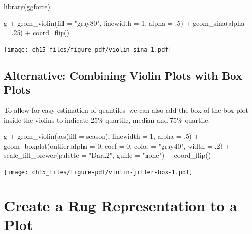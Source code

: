 \documentclass[
  letterpaper,
]{scrbook}
\newenvironment{Shaded}{\begin{snugshade}}{\end{snugshade}}
\newcommand{\AttributeTok}[1]{\textcolor[rgb]{0.40,0.45,0.13}{#1}}
\newcommand{\DecValTok}[1]{\textcolor[rgb]{0.68,0.00,0.00}{#1}}
\newcommand{\FunctionTok}[1]{\textcolor[rgb]{0.28,0.35,0.67}{#1}}
\newcommand{\NormalTok}[1]{\textcolor[rgb]{0.00,0.23,0.31}{#1}}
\newcommand{\SpecialCharTok}[1]{\textcolor[rgb]{0.37,0.37,0.37}{#1}}
\newcommand{\StringTok}[1]{\textcolor[rgb]{0.13,0.47,0.30}{#1}}
\begin{document}
\begin{Shaded}
\begin{Highlighting}[]
\FunctionTok{library}\NormalTok{(ggforce)}

\NormalTok{g }\SpecialCharTok{+} \FunctionTok{geom\_violin}\NormalTok{(}\AttributeTok{fill =} \StringTok{"gray80"}\NormalTok{, }\AttributeTok{linewidth =} \DecValTok{1}\NormalTok{, }\AttributeTok{alpha =}\NormalTok{ .}\DecValTok{5}\NormalTok{) }\SpecialCharTok{+}
    \FunctionTok{geom\_sina}\NormalTok{(}\AttributeTok{alpha =}\NormalTok{ .}\DecValTok{25}\NormalTok{) }\SpecialCharTok{+}
    \FunctionTok{coord\_flip}\NormalTok{()}
\end{Highlighting}
\end{Shaded}

\texttt{[image: ch15\_files/figure-pdf/violin-sina-1.pdf]}

\subsection{Alternative: Combining Violin Plots with Box
Plots}\label{alternative-combining-violin-plots-with-box-plots}

To allow for easy estimation of quantiles, we can also add the box of
the box plot inside the violins to indicate 25\%-quartile, median and
75\%-quartile:

\begin{Shaded}
\begin{Highlighting}[]
\NormalTok{g }\SpecialCharTok{+} \FunctionTok{geom\_violin}\NormalTok{(}\FunctionTok{aes}\NormalTok{(}\AttributeTok{fill =}\NormalTok{ season), }\AttributeTok{linewidth =} \DecValTok{1}\NormalTok{, }\AttributeTok{alpha =}\NormalTok{ .}\DecValTok{5}\NormalTok{) }\SpecialCharTok{+}
    \FunctionTok{geom\_boxplot}\NormalTok{(}\AttributeTok{outlier.alpha =} \DecValTok{0}\NormalTok{, }\AttributeTok{coef =} \DecValTok{0}\NormalTok{,}
                 \AttributeTok{color =} \StringTok{"gray40"}\NormalTok{, }\AttributeTok{width =}\NormalTok{ .}\DecValTok{2}\NormalTok{) }\SpecialCharTok{+}
    \FunctionTok{scale\_fill\_brewer}\NormalTok{(}\AttributeTok{palette =} \StringTok{"Dark2"}\NormalTok{, }\AttributeTok{guide =} \StringTok{"none"}\NormalTok{) }\SpecialCharTok{+}
    \FunctionTok{coord\_flip}\NormalTok{()}
\end{Highlighting}
\end{Shaded}

\texttt{[image: ch15\_files/figure-pdf/violin-jitter-box-1.pdf]}

\section{Create a Rug Representation to a
Plot}\label{create-a-rug-representation-to-a-plot}
\end{document}
